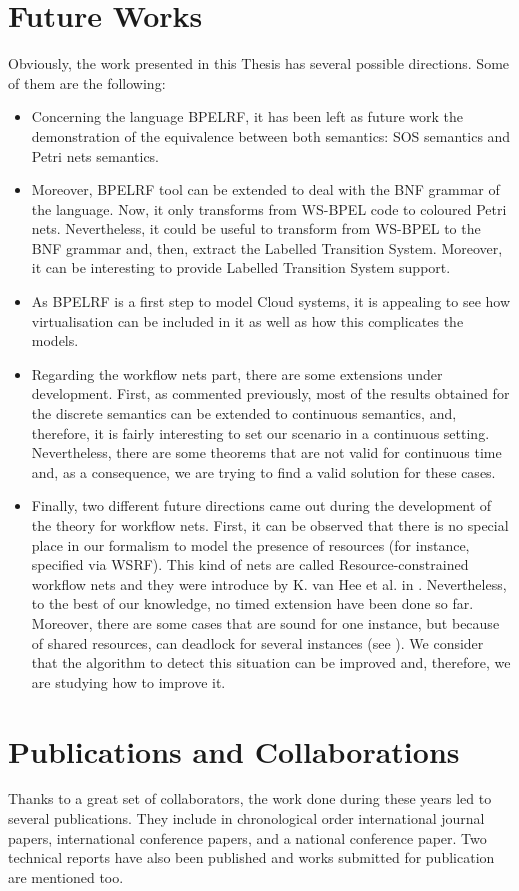 \section{Future Works}\label{future}
%
Obviously, the work presented in this Thesis has several possible directions. Some of them are the following:
%
\begin{itemize}
%
\item Concerning the language BPELRF, it has been left as future work the demonstration of the equivalence between both semantics: SOS semantics and Petri nets semantics.
%
\item Moreover, BPELRF tool can be extended to deal with the BNF grammar of the language. Now, it only transforms from WS-BPEL code to coloured Petri nets. Nevertheless, it could be useful to transform from WS-BPEL to the BNF grammar and, then, extract the Labelled Transition System. Moreover, it can be interesting to provide Labelled Transition System support.
%
\item As BPELRF is a first step to model Cloud systems, it is appealing to see how virtualisation can be included in it as well as how this complicates the models.
%
\item Regarding the workflow nets part, there are some extensions under development. First, as commented previously, most of the results obtained for the discrete semantics can be extended to continuous semantics, and, therefore, it is fairly interesting to set our scenario in a continuous setting. Nevertheless, there are some theorems  that are not valid for continuous time and, as a consequence, we are trying to find a valid solution for these cases.
%
\item Finally, two different future directions came out during the development of the theory for workflow nets. First, it can be observed that there is no special place in our formalism to model the presence of resources (for instance, specified via WSRF). This kind of nets are called Resource-constrained workflow nets and they were introduce by K. van Hee et al. in \cite{Hee05}. Nevertheless, to the best of our knowledge, no timed extension have been done so far. Moreover, there are some cases that are sound for one instance, but because of shared resources, can deadlock for several instances (see \cite{Juhas10}). We consider that the algorithm to detect this situation can be improved and, therefore, we are studying how to improve it.  
%
%
\end{itemize}
%
\section{Publications and Collaborations}\label{publications}
%
Thanks to a great set of collaborators, the work done during these years led to several publications. They include in chronological order international journal papers, international conference papers, and a national conference paper. Two technical reports have also been published and works submitted for publication are mentioned too.
%
